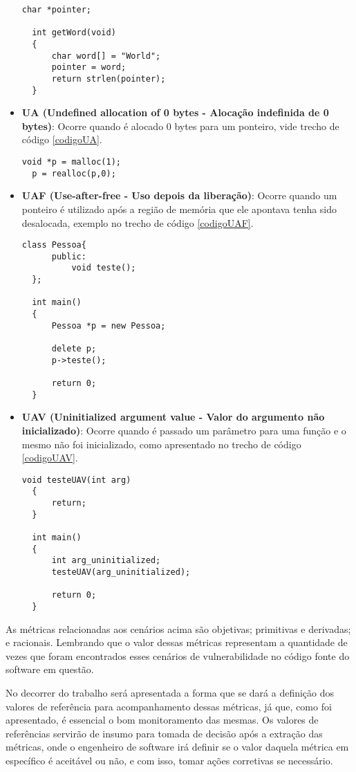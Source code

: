 \begin{itemize}
    \begin{lstlisting}[caption={Código exemplo SAIGV}, label=codigoSAIGV]
  char *pointer;

  int getWord(void)
  {
      char word[] = "World";
      pointer = word;
      return strlen(pointer);
  }
    \end{lstlisting}
  \item \textbf{UA (Undefined allocation of 0 bytes - Alocação indefinida de 0 bytes)}: Ocorre quando é alocado 0 bytes para
    um ponteiro, vide trecho de código \ref{codigoUA}.

    \begin{lstlisting}[caption={Código exemplo UA}, label=codigoUA]
  void *p = malloc(1);
  p = realloc(p,0);
    \end{lstlisting}
  \item \textbf{UAF (Use-after-free - Uso depois da liberação)}: Ocorre quando um ponteiro é utilizado após a região de memória
    que ele apontava tenha sido desalocada, exemplo no trecho de código \ref{codigoUAF}.

    \begin{lstlisting}[caption={Código exemplo UAF}, label=codigoUAF]
  class Pessoa{
      public:
          void teste();
  };

  int main()
  {
      Pessoa *p = new Pessoa;

      delete p;
      p->teste();

      return 0;
  }
    \end{lstlisting}
  \item \textbf{UAV (Uninitialized argument value - Valor do argumento não inicializado)}: Ocorre quando é passado um parâmetro
    para uma função e o mesmo não foi inicializado, como apresentado no trecho de código \ref{codigoUAV}.

    \begin{lstlisting}[caption={Código exemplo UAV}, label=codigoUAV]
  void testeUAV(int arg)
  {
      return;
  }

  int main()
  {
      int arg_uninitialized;
      testeUAV(arg_uninitialized);
      
      return 0;
  }
    \end{lstlisting}
\end{itemize}

As métricas relacionadas aos cenários acima são objetivas; primitivas e derivadas; e racionais. Lembrando que o valor dessas 
métricas representam a quantidade de vezes que foram encontrados esses cenários de vulnerabilidade no código fonte do software 
em questão.

No decorrer do trabalho será apresentada a forma que se dará a definição dos valores de referência para acompanhamento dessas
métricas, já que, como foi apresentado, é essencial o bom monitoramento das mesmas. Os valores de referências servirão
de insumo para tomada de decisão após a extração das métricas, onde o engenheiro de software irá definir se o valor daquela
métrica em específico é aceitável ou não, e com isso, tomar ações corretivas se necessário.

